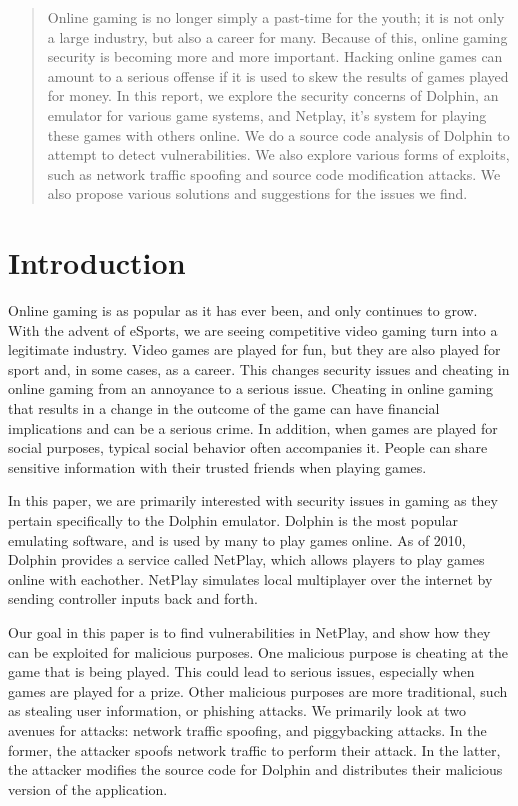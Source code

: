 \documentclass[conference]{IEEEtran}
\begin{document}
\begin{abstract}
   Online gaming is no longer simply a past-time for the youth; it is not only a large industry, but also a career for many.
   Because of this, online gaming security is becoming more and more important.
   Hacking online games can amount to a serious offense if it is used to skew the results of games played for money.
   In this report, we explore the security concerns of Dolphin, an emulator for various game systems, and Netplay, it's system for playing these games with others online.
   We do a source code analysis of Dolphin to attempt to detect vulnerabilities.
   We also explore various forms of exploits, such as network traffic spoofing and source code modification attacks.
   We also propose various solutions and suggestions for the issues we find.
\end{abstract}

\section{Introduction}
Online gaming is as popular as it has ever been, and only continues to grow. 
With the advent of eSports, we are seeing competitive video gaming turn into a legitimate industry. 
Video games are played for fun, but they are also played for sport and, in some cases, as a career. 
This changes security issues and cheating in online gaming from an annoyance to a serious issue. 
Cheating in online gaming that results in a change in the outcome of the game can have financial implications and can be a serious crime.
In addition, when games are played for social purposes, typical social behavior often accompanies it. 
People can share sensitive information with their trusted friends when playing games.

In this paper, we are primarily interested with security issues in gaming as they pertain specifically to the Dolphin emulator.
Dolphin is the most popular emulating software, and is used by many to play games online.
As of 2010, Dolphin provides a service called NetPlay, which allows players to play games online with eachother.
NetPlay simulates local multiplayer over the internet by sending controller inputs back and forth.

Our goal in this paper is to find vulnerabilities in NetPlay, and show how they can be exploited for malicious purposes.
One malicious purpose is cheating at the game that is being played.
This could lead to serious issues, especially when games are played for a prize.
Other malicious purposes are more traditional, such as stealing user information, or phishing attacks. 
We primarily look at two avenues for attacks: network traffic spoofing, and piggybacking attacks.
In the former, the attacker spoofs network traffic to perform their attack.
In the latter, the attacker modifies the source code for Dolphin and distributes their malicious version of the application.
\end{document}

